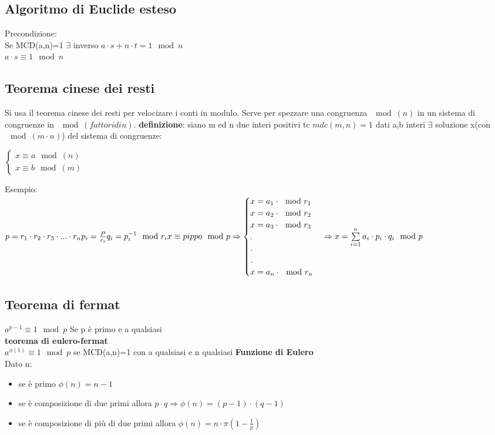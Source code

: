\documentclass[10pt,a4paper]{article}
\begin{document}
\subsection{Algoritmo di Euclide esteso}
Precondizione:\\
Se MCD(a,n)=1 $\exists$ inverso
$a \cdot s+n \cdot t = 1 \mod n$\\
$a \cdot s \equiv 1 \mod n$

\subsection{Teorema cinese dei resti}
Si usa il teorema cinese dei resti per velocizare i conti in modulo. Serve per spezzare una congruenza $\mod (n)$ in un sistema di congruenze in $\mod(fattori di n)$.
\textbf{definizione}: siano m ed n due interi positivi tc $mdc(m,n)=1$ dati a,b interi $\exists$ soluzione x(con $\! \! \! \mod(m\cdot n)$) del sistema di congruenze:

$\begin{cases}
x \equiv a \mod(n) \\
x \equiv b \mod(m)
\end{cases}$

Esempio:\\
$
p= r_1 \cdot r_2 \cdot r_3 \cdot ... \cdot r_n \\
p_i=\frac{P}{r_i} \\
q_i=p_i^{-1} \mod r_i\\
x \equiv pippo \mod p \Rightarrow
\begin{cases}
x=a_1 \cdot \mod r_1 \\
x=a_2 \cdot \mod r_2 \\
x=a_3 \cdot \mod r_3 \\
. \\
. \\
. \\
x=a_n \cdot \mod r_n
\end{cases}
\Rightarrow x= \sum\limits_{i=1}^{n} a_i \cdot p_i \cdot q_i \mod p
$
\subsection{Teorema di fermat}
$a^{p-1} \equiv 1 \mod p$ Se p è primo e a qualsiasi \\
\textbf{teorema di eulero-fermat}\\
$a^{\phi(1)} \equiv 1 \mod p$ se MCD(a,n)=1 con a qualsiasi e n qualsiasi
\textbf{Funzione di Eulero}\\
Dato n:\\
\begin{itemize}
\item se è primo $\phi(n) = n-1$
\item se è composizione di due primi allora $p \cdot q \Rightarrow \phi(n)= (p-1)\cdot (q-1)$
\item se è composizione di più di due primi allora $\phi(n) = n \cdot \pi(1-\frac{1}{p}) $
\end{itemize}
\end{document}
